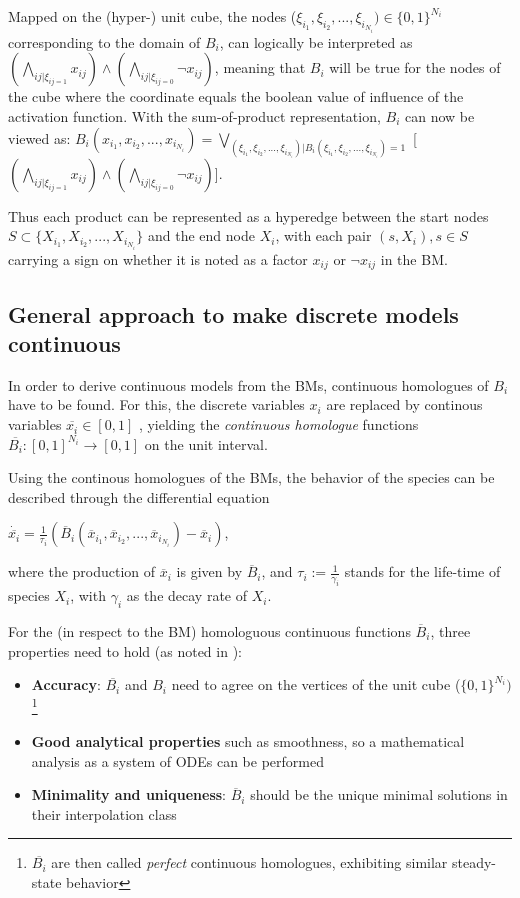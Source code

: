 \documentclass[11pt]{article}
\begin{document}
Mapped on the (hyper-) unit cube, the nodes ($\xi_{i_{1}},\xi_{i_{2}},..., \xi_{i_{N_{i}}}) \in \{0, 1\}^{N_{i}}$ corresponding to the domain of $B_{i}$, can logically be interpreted as $( \bigwedge_{ij| \xi_{ij = 1}} x_{ij} ) \wedge ( \bigwedge_{ij| \xi_{ij = 0}} \neg x_{ij} )$, meaning that $B_{i}$ will be true for the nodes of the cube where
the coordinate equals the boolean value of influence of the activation function.
With the sum-of-product representation, $B_{i}$ can now be viewed as: $B_{i} (x_{i_{1}}, x_{i_{2}},..., x_{i_{N_{i}}} ) = \bigvee_{(\xi_{i_{1}}, \xi_{i_{2}},..., \xi_{i_{N_{i}}}) | B_{i} ( \xi_{i_{1}}, \xi_{i_{2}},..., \xi_{i_{N_{i}}}) = 1} $ [ $( \bigwedge_{ij | \xi_{ij = 1}} x_{ij}) \wedge ( \bigwedge _{ij | \xi_{ij = 0}}  \neg x_{ij} ) $].

Thus each product can be represented  as a hyperedge between the start nodes $ S \subset \{X_{i_{1}}, X_{i_{2}},..., X_{i_{N_{i}}}\}$ and the end node $X_{i}$, with each pair $(s, X_{i}), s \in S$ carrying a sign on whether it is noted as a factor $x_{ij}$ or $\neg x_{ij}$ in the BM.

\subsection{General approach to make discrete models continuous} \label{ssec:prop}
In order to derive continuous models from the BMs, continuous homologues of $B_{i}$ have to be found. For this, the discrete variables $x_{i}$ are replaced by continous variables $\overline{x_{i}} \in [0, 1]$ , yielding the \textit{continuous homologue} functions $\overline{B_{i}} : [0, 1]^{N_{i}} \rightarrow [0, 1]$ on the unit interval.

Using the continous homologues of the BMs, the behavior of the species can be described through the differential equation

 $\dot{\overline{x_{i}}} = \frac{1}{\tau_{i}} (\overline{B}_{i} (\overline{x}_{i_{1}}, \overline{x}_{i_{2}},..., \overline{x}_{i_{N_{i}}}) - \overline{x}_{i})$,
 
 where the production of $\overline{x}_{i}$ is given by $\overline{B}_{i}$, and $\tau_{i} := \frac{1}{\gamma_{i}}$ stands for the life-time of species $X_{i}$, with $\gamma_{i}$ as the decay rate of $X_{i}$.

For the (in respect to the BM) homologuous continuous functions $\overline{B}_{i}$, three properties need to hold (as noted in \cite{Wittmann}):
\begin{itemize}
	\item \textbf{Accuracy}: $\overline{B_{i}}$ and $B_{i}$ need to agree on the vertices of the unit cube ($\{0,1\}^{N_{i}})$ \footnote{$\overline{B_{i}}$ are then called \textit{perfect} continuous homologues, exhibiting similar steady-state behavior}
	\item \textbf{Good analytical properties} such as smoothness, so a mathematical analysis as a system of ODEs can be performed
	\item \textbf{Minimality and uniqueness}: $\overline{B}_{i}$ should be the unique minimal solutions in their interpolation class
\end{itemize}
\end{document}

